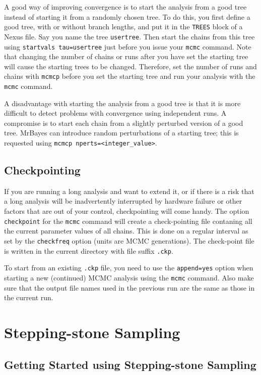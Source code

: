 \documentclass[12pt]{book}
\newcommand{\ttt}[1]{\texttt{#1}}
\begin{document}
A good way of improving convergence is to start the analysis from a good tree instead of starting
it from a randomly chosen tree. To do this, you first define a good tree, with or without branch
lengths, and put it in the \ttt{TREES} block of a Nexus file. Say you name the tree \ttt{usertree}.
Then start the chains from this tree using \ttt{startvals tau=usertree} just before you issue your
\ttt{mcmc} command. Note that changing the number of chains or runs after you have set the starting
tree will cause the starting trees to be changed. Therefore, set the number of runs and chains with
\ttt{mcmcp} before you set the starting tree and run your analysis with the \ttt{mcmc} command.

A disadvantage with starting the analysis from a good tree is that it is more difficult to detect
problems with convergence using independent runs. A compromise is to start each chain from a
slightly perturbed version of a good tree. MrBayes can introduce random perturbations of a starting
tree; this is requested using \ttt{mcmcp nperts=<integer\_value>}.

\subsection{Checkpointing}
\label{checkpointing}

If you are running a long analysis and want to extend it, or if there is a risk that a long
analysis will be inadvertently interrupted by hardware failure or other factors that are out of
your control, checkpointing will come handy. The option \ttt{checkpoint} for the \ttt{mcmc} command
will create a check-pointing file contaning all the current parameter values of all chains. This
is done on a regular interval as set by the \ttt{checkfreq} option (units are MCMC generations).
The check-point file is written in the current directory with file suffix \ttt{.ckp}.

To start from an existing \ttt{.ckp} file, you need to use the \ttt{append=yes} option when
starting a new (continued) MCMC analysis using the \ttt{mcmc} command. Also make sure that the
output file names used in the previous run are the same as those in the current run.

\section{Stepping-stone Sampling}

\subsection{Getting Started using Stepping-stone Sampling}
\end{document}
